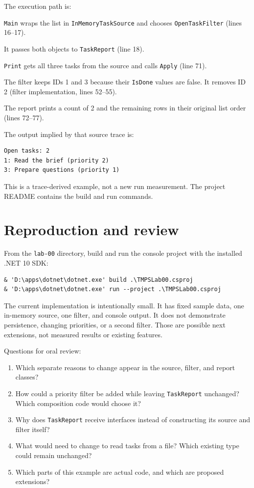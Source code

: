 \documentclass{utmreport}
\begin{document}
The execution path is:
\begin{utmenumerate}
\item \texttt{Main} wraps the list in \texttt{InMemoryTaskSource} and chooses \texttt{OpenTaskFilter} (lines 16--17).
\item It passes both objects to \texttt{TaskReport} (line 18).
\item \texttt{Print} gets all three tasks from the source and calls \texttt{Apply} (line 71).
\item The filter keeps IDs 1 and 3 because their \texttt{IsDone} values are false. It removes ID 2 (filter implementation, lines 52--55).
\item The report prints a count of 2 and the remaining rows in their original list order (lines 72--77).
\end{utmenumerate}

The output implied by that source trace is:
\begin{lstlisting}
Open tasks: 2
1: Read the brief (priority 2)
3: Prepare questions (priority 1)
\end{lstlisting}
This is a trace-derived example, not a new run measurement. The project README contains the build and run commands.

\chapter{Reproduction and review}
From the \texttt{lab-00} directory, build and run the console project with the installed .NET 10 SDK:
\begin{lstlisting}
& 'D:\apps\dotnet\dotnet.exe' build .\TMPSLab00.csproj
& 'D:\apps\dotnet\dotnet.exe' run --project .\TMPSLab00.csproj
\end{lstlisting}

The current implementation is intentionally small. It has fixed sample data, one in-memory source, one filter, and console output. It does not demonstrate persistence, changing priorities, or a second filter. Those are possible next extensions, not measured results or existing features.

Questions for oral review:
\begin{enumerate}
\item Which separate reasons to change appear in the source, filter, and report classes?
\item How could a priority filter be added while leaving \texttt{TaskReport} unchanged? Which composition code would choose it?
\item Why does \texttt{TaskReport} receive interfaces instead of constructing its source and filter itself?
\item What would need to change to read tasks from a file? Which existing type could remain unchanged?
\item Which parts of this example are actual code, and which are proposed extensions?
\end{enumerate}
\end{document}
